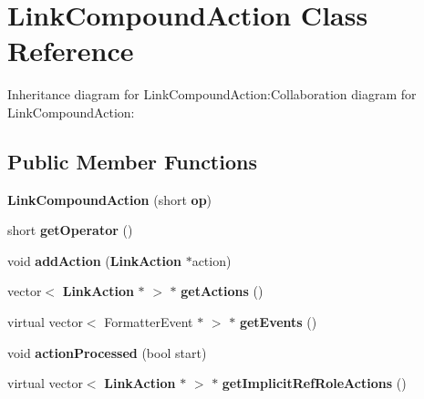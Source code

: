 \section{LinkCompoundAction Class Reference}
\label{classbr_1_1pucrio_1_1telemidia_1_1ginga_1_1ncl_1_1model_1_1link_1_1LinkCompoundAction}
Inheritance diagram for LinkCompoundAction:Collaboration diagram for LinkCompoundAction:\subsection*{Public Member Functions}
\begin{CompactItemize}
\item 
\textbf{LinkCompoundAction} (short {\bf op})\label{classbr_1_1pucrio_1_1telemidia_1_1ginga_1_1ncl_1_1model_1_1link_1_1LinkCompoundAction_8bc99dd0faf432e7fc8251d0c9ecc209}

\item 
short \textbf{getOperator} ()\label{classbr_1_1pucrio_1_1telemidia_1_1ginga_1_1ncl_1_1model_1_1link_1_1LinkCompoundAction_1303a32e05e883b65d250ca25fa871ad}

\item 
void \textbf{addAction} ({\bf LinkAction} $\ast$action)\label{classbr_1_1pucrio_1_1telemidia_1_1ginga_1_1ncl_1_1model_1_1link_1_1LinkCompoundAction_2b5528e3a7ad9fac124e907f4fcf19cc}

\item 
vector$<$ {\bf LinkAction} $\ast$ $>$ $\ast$ \textbf{getActions} ()\label{classbr_1_1pucrio_1_1telemidia_1_1ginga_1_1ncl_1_1model_1_1link_1_1LinkCompoundAction_d5f1c38b810d7762883559acbe673925}

\item 
virtual vector$<$ FormatterEvent $\ast$ $>$ $\ast$ \textbf{getEvents} ()\label{classbr_1_1pucrio_1_1telemidia_1_1ginga_1_1ncl_1_1model_1_1link_1_1LinkCompoundAction_77d29bf7857d5b09d0ef4fb69cfc31cd}

\item 
void \textbf{actionProcessed} (bool start)\label{classbr_1_1pucrio_1_1telemidia_1_1ginga_1_1ncl_1_1model_1_1link_1_1LinkCompoundAction_b513b06891fd2a5cb513ea5628127af2}

\item 
virtual vector$<$ {\bf LinkAction} $\ast$ $>$ $\ast$ \textbf{getImplicitRefRoleActions} ()\label{classbr_1_1pucrio_1_1telemidia_1_1ginga_1_1ncl_1_1model_1_1link_1_1LinkCompoundAction_adcae512f9241400f1d53744415530a9}

\end{CompactItemize}

